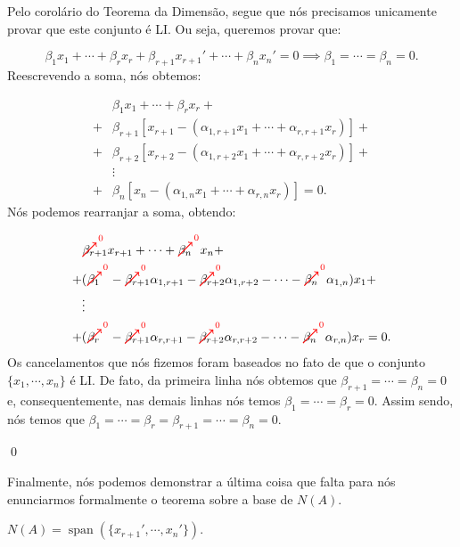 \begin{Proof}
	Pelo corolário do Teorema da Dimensão, segue que nós precisamos unicamente provar que este conjunto é LI. Ou seja, queremos provar que:
	
	$$
	\beta_1x_1 + \cdots + \beta_rx_r + \beta_{r + 1}x_{r + 1}' + \cdots + \beta_nx_n' = 0\implies\beta_1 = \cdots = \beta_n = 0.
	$$
	Reescrevendo a soma, nós obtemos:
	
	\begin{align*}
		&\beta_1x_1 + \cdots + \beta_rx_r + \\
		+ &\beta_{r + 1}[x_{r + 1} - (\alpha_{1, r + 1}x_1 + \cdots + \alpha_{r, r + 1}x_r)] + \\
		+ &\beta_{r + 2}[x_{r + 2} - (\alpha_{1, r + 2}x_1 + \cdots + \alpha_{r, r + 2}x_r)] + \\
		&\vdots \\
		+ &\beta_n[x_n - (\alpha_{1, n}x_1 + \cdots + \alpha_{r, n}x_r)] = 0.
	\end{align*}
	Nós podemos rearranjar a soma, obtendo:
	
	\begin{align*}
		&\canceltozero{\beta_{r + 1}}x_{r + 1} + \cdots + \canceltozero{\beta_n}x_n + \\
		+ &(\canceltozero{\beta_1} - \canceltozero{\beta_{r + 1}}\alpha_{1, r + 1} - \canceltozero{\beta_{r + 2}}\alpha_{1, r + 2} - \cdots - \canceltozero{\beta_n}\alpha_{1, n})x_1 + \\
		&\vdots \\
		+ &(\canceltozero{\beta_r} - \canceltozero{\beta_{r + 1}}\alpha_{r, r + 1} - \canceltozero{\beta_{r + 2}}\alpha_{r, r + 2} - \cdots - \canceltozero{\beta_n}\alpha_{r, n})x_r = 0.
	\end{align*}
	Os cancelamentos que nós fizemos foram baseados no fato de que o conjunto $\{x_1, \cdots, x_n\}$ é LI. De fato, da primeira linha nós obtemos que $\beta_{r + 1} = \cdots = \beta_n = 0$ e, consequentemente, nas demais linhas nós temos $\beta_1 = \cdots = \beta_r = 0$. Assim sendo, nós temos que $\beta_1 = \cdots = \beta_r = \beta_{r + 1} = \cdots = \beta_n = 0$.
	
	\qed
\end{Proof}

Finalmente, nós podemos demonstrar a última coisa que falta para nós enunciarmos formalmente o teorema sobre a base de $N(A)$.

\begin{Lemma}
	$N(A) = \operatorname{span}(\{x_{r + 1}', \cdots, x_n'\})$.
\end{Lemma}

